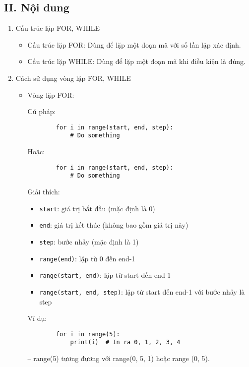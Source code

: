 \subsection*{\textbf{II. Nội dung}}
\begin{enumerate}[label=\alph*.]
    \item Cấu trúc lặp FOR, WHILE
    \begin{itemize}
        \item Cấu trúc lặp FOR: Dùng để lặp một đoạn mã với số lần lặp xác định.
        \item Cấu trúc lặp WHILE: Dùng để lặp một đoạn mã khi điều kiện là đúng.
    \end{itemize}

    \item Cách sử dụng vòng lặp FOR, WHILE
    \begin{itemize}
        \item Vòng lặp FOR:

        Cú pháp:
        \begin{lstlisting}
        for i in range(start, end, step):
            # Do something
        \end{lstlisting}
        \vspace{-3.5em}
        Hoặc:
        \begin{lstlisting}
        for i in range(start, end, step):
            # Do something
        \end{lstlisting}
        \vspace{-3.5em}
        Giải thích:
        \begin{itemize}
            \item \texttt{start}: giá trị bắt đầu (mặc định là 0)
            \item \texttt{end}: giá trị kết thúc (không bao gồm giá trị này)
            \item \texttt{step}: bước nhảy (mặc định là 1)
            \item \texttt{range(end)}: lặp từ 0 đến end-1
            \item \texttt{range(start, end)}: lặp từ start đến end-1
            \item \texttt{range(start, end, step)}: lặp từ start đến end-1 với bước nhảy là step
        \end{itemize}

        Ví dụ:
        \begin{lstlisting}
        for i in range(5):
            print(i)  # In ra 0, 1, 2, 3, 4
        \end{lstlisting}
        \vspace{-4.5em}
        -- range(5) tương đương với range(0, 5, 1) hoặc range (0, 5).
    \end{itemize}


\end{enumerate}
